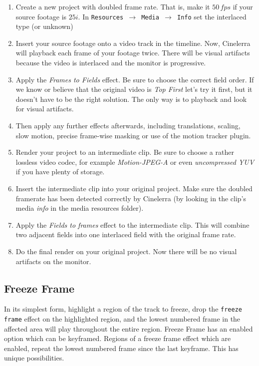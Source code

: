 \begin{enumerate}
    \item Create a new project with doubled frame rate. That is, make it $50\,fps$ if your source footage is $25i$. 
    In \texttt{Resources $\rightarrow$ Media $\rightarrow$ Info} set the interlaced type (or unknown)
    \item Insert your source footage onto a video track in the timeline. Now, Cinelerra will playback each
    frame of your footage twice. There will be visual artifacts because the video is interlaced and the
    monitor is progressive.
    \item Apply the \textit{Frames to Fields} effect. Be sure to choose the correct field order. If we know or believe that the original video is \textit{Top First} let's try it first, but it doesn't have to be the right solution. The only way is to playback and look for visual artifacts.
    \item Then apply any further effects afterwards, including translations, scaling, slow motion, precise
    frame-wise masking or use of the motion tracker plugin.
    \item Render your project to an intermediate clip. Be sure to choose a rather lossless video codec, for
    example \textit{Motion-JPEG-A} or even \textit{uncompressed YUV} if you have plenty of storage.
    \item Insert the intermediate clip into your original project. Make sure the doubled framerate has been
    detected correctly by Cinelerra (by looking in the clip's media \textit{info} in the media resources folder).
    \item Apply the \textit{Fields to frames} effect to the intermediate clip. This will combine two adjacent fields
    into one interlaced field with the original frame rate.
    \item Do the final render on your original project. Now there will be no visual artifacts on the monitor.
\end{enumerate}

\subsection{Freeze Frame}%
\label{sub:freeze_frame}

In its simplest form, highlight a region of the track to freeze, drop the \texttt{freeze frame} effect on the highlighted region, and the lowest numbered frame in the affected area will play throughout the entire region. Freeze Frame has an enabled option which can be keyframed. Regions of a freeze frame effect which are enabled, repeat the lowest numbered frame since the last keyframe. This has unique possibilities.

